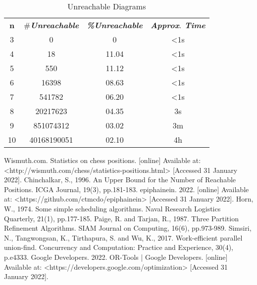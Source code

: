 \documentclass{amsart}
\begin{document}
\begin{table}[hbtp]
	\caption{Unreachable Diagrams} \label{results}
	\begin{center}
		\begin{tabular}{cccc}
			\toprule
			\textbf{n}& \textbf{\textit{$\#$Unreachable}}& \textbf{\textit{ \%Unreachable}}& \textbf{\textit{Approx$.$ Time}} \\
			\cmidrule(lr){1-1}\cmidrule(lr){2-2}\cmidrule(lr){3-3}\cmidrule(lr){4-4}
			3 & 0 & 0 & <1s \\
			4 & 18 & 11.04 & <1s \\
			5 & 550 & 11.12 & <1s \\
			6 & 16398 & 08.63 & <1s \\
			7 & 541782 & 06.20 & <1s \\
			8 & 20217623 & 04.35 & 3s \\
			9 & 851074312 & 03.02 & 3m \\
			10 & 40168190051 & 02.10 & 4h \\
			\bottomrule
		\end{tabular}
	\end{center}
\end{table}

{\raggedright
\begin{thebibliography}{\emergencystretch=1em}
 Wismuth.com. Statistics on chess positions. [online] Available at: <http://wismuth.com/chess/statistics-positions.html> [Accessed 31 January 2022].
 Chinchalkar, S., 1996. An Upper Bound for the Number of Reachable Positions. ICGA Journal, 19(3), pp.181-183.
 epiphainein. 2022. [online] Available at: <https://github.com/ctmcdo/epiphainein> [Accessed 31 January 2022].
 Horn, W., 1974. Some simple scheduling algorithms. Naval Research Logistics Quarterly, 21(1), pp.177-185.
 Paige, R. and Tarjan, R., 1987. Three Partition Refinement Algorithms. SIAM Journal on Computing, 16(6), pp.973-989.
 Simsiri, N., Tangwongsan, K., Tirthapura, S. and Wu, K., 2017. Work-efficient parallel union-find. Concurrency and Computation: Practice and Experience, 30(4), p.e4333.
 Google Developers. 2022. OR-Tools  |  Google Developers. [online] Available at: <https://developers.google.com/optimization> [Accessed 31 January 2022].
\end{thebibliography}
}
\end{document}
